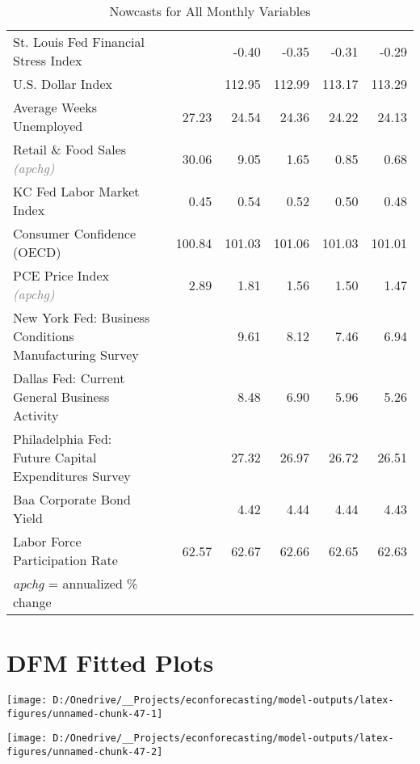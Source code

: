 \documentclass[11pt, letterpaper]{article}\usepackage[]{graphicx}\usepackage[]{color}
\begin{document}
\begin{table}[H]
\begin{tabular}{lrrrrrr}
  St. Louis Fed Financial Stress Index &  &  & -0.40 & -0.35 & -0.31 & -0.29 \\ 
  U.S. Dollar Index &  &  & 112.95 & 112.99 & 113.17 & 113.29 \\ 
  Average Weeks Unemployed &  & 27.23 & 24.54 & 24.36 & 24.22 & 24.13 \\ 
  Retail \& Food Sales \textit{\footnotesize\textcolor{gray}{(apchg)}} &  & 30.06 & 9.05 & 1.65 & 0.85 & 0.68 \\ 
  KC Fed Labor Market Index &  & 0.45 & 0.54 & 0.52 & 0.50 & 0.48 \\ 
  Consumer Confidence (OECD) &  & 100.84 & 101.03 & 101.06 & 101.03 & 101.01 \\ 
  PCE Price Index \textit{\footnotesize\textcolor{gray}{(apchg)}} &  & 2.89 & 1.81 & 1.56 & 1.50 & 1.47 \\ 
  New York Fed: Business Conditions Manufacturing Survey &  &  & 9.61 & 8.12 & 7.46 & 6.94 \\ 
  Dallas Fed: Current General Business Activity &  &  & 8.48 & 6.90 & 5.96 & 5.26 \\ 
  Philadelphia Fed: Future Capital Expenditures Survey &  &  & 27.32 & 26.97 & 26.72 & 26.51 \\ 
  Baa Corporate Bond Yield &  &  & 4.42 & 4.44 & 4.44 & 4.43 \\ 
  Labor Force Participation Rate &  & 62.57 & 62.67 & 62.66 & 62.65 & 62.63 \\ 
   \hline 
 \textit{apchg} = annualized \% change 
\end{tabular}
\endgroup
\caption{Nowcasts for All Monthly Variables} 
\end{table}



\appendix
\appendixpage
\addappheadtotoc

\section{DFM Fitted Plots}


{\centering \texttt{[image: D:/Onedrive/\_\_Projects/econforecasting/model-outputs/latex-figures/unnamed-chunk-47-1]} 

}




{\centering \texttt{[image: D:/Onedrive/\_\_Projects/econforecasting/model-outputs/latex-figures/unnamed-chunk-47-2]} 

}
\end{document}
